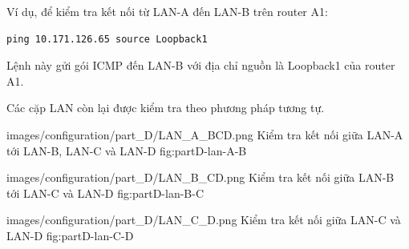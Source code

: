 Ví dụ, để kiểm tra kết nối
từ LAN-A đến LAN-B trên router A1:

\begin{lstlisting}
ping 10.171.126.65 source Loopback1
\end{lstlisting}

Lệnh này gửi gói ICMP đến LAN-B
với địa chỉ nguồn là Loopback1
của router A1.

Các cặp LAN còn lại được kiểm tra
theo phương pháp tương tự.


\partzeroimage
{images/configuration/part_D/LAN_A_BCD.png}
{Kiểm tra kết nối giữa LAN-A tới LAN-B, LAN-C và LAN-D}
{fig:partD-lan-A-B}


\partzeroimage
{images/configuration/part_D/LAN_B_CD.png}
{Kiểm tra kết nối giữa LAN-B tới LAN-C và LAN-D}
{fig:partD-lan-B-C}

\partzeroimage
{images/configuration/part_D/LAN_C_D.png}
{Kiểm tra kết nối giữa LAN-C và LAN-D}
{fig:partD-lan-C-D}
